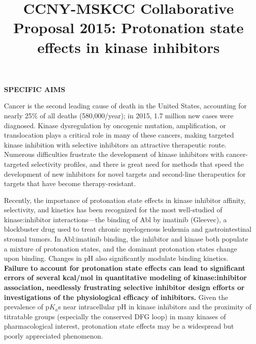 \documentclass[11pt]{article}
\title{CCNY-MSKCC Collaborative Proposal 2015: Protonation state effects in kinase inhibitors}
\begin{document}


{\large \bf SPECIFIC AIMS}

Cancer is the second leading cause of death in the United States, accounting for nearly 25\% of all deaths (580,000/year); in 2015, 1.7 million new cases were diagnosed.
Kinase dysregulation by oncogenic mutation, amplification, or translocation plays a critical role in many of these cancers, making targeted kinase inhibition with selective inhibitors an attractive therapeutic route.
Numerous difficulties frustrate the development of kinase inhibitors with cancer-targeted selectivity profiles, and there is great need for methods that speed the development of new inhibitors for novel targets and second-line therapeutics for targets that have become therapy-resistant.

Recently, the importance of protonation state effects in kinase inhibitor affinity, selectivity, and kinetics has been recognized for the most well-studied of kinase:inhibitor interactions---the binding of Abl by imatinib (Gleevec), a blockbuster drug used to treat chronic myelogenous leukemia and gastrointestinal stromal tumors.
In Abl:imatinib binding, the inhibitor and kinase both populate a mixture of protonation states, and the dominant protonation states change upon binding.
Changes in pH also significantly modulate binding kinetics.
{\bf Failure to account for protonation state effects can lead to significant errors of several kcal/mol in quantitative modeling of kinase:inhibitor association, needlessly frustrating selective inhibitor design efforts or investigations of the physiological efficacy of inhibitors.}
Given the prevalence of p$K_a$s near intracellular pH in kinase inhibitors and the proximity of titratable groups (especially the conserved DFG loop) in many kinases of pharmacological interest, protonation state effects may be a widespread but poorly appreciated phenomenon.
\end{document}
